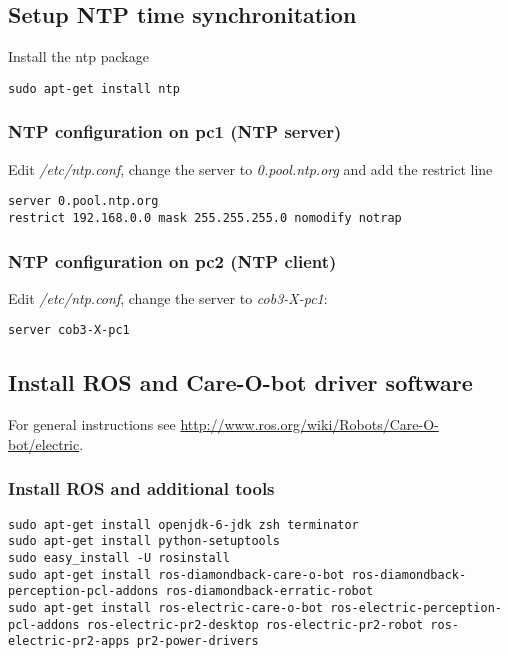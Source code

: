 \subsection{Setup NTP time synchronitation}
Install the ntp package

\begin{lstlisting}
sudo apt-get install ntp
\end{lstlisting}

\subsubsection{NTP configuration on pc1 (NTP server)}
Edit \textit{/etc/ntp.conf}, change the server to \textit{0.pool.ntp.org} and add the restrict line

\begin{lstlisting} 
server 0.pool.ntp.org
restrict 192.168.0.0 mask 255.255.255.0 nomodify notrap
\end{lstlisting}

\subsubsection{NTP configuration on pc2 (NTP client)}
Edit \textit{/etc/ntp.conf}, change the server to \textit{cob3-X-pc1}:
\begin{lstlisting}
server cob3-X-pc1
\end{lstlisting}

\subsection{Install ROS and Care-O-bot driver software}
For general instructions see \url{http://www.ros.org/wiki/Robots/Care-O-bot/electric}.

\subsubsection{Install ROS and additional tools}
\begin{lstlisting}
sudo apt-get install openjdk-6-jdk zsh terminator
sudo apt-get install python-setuptools
sudo easy_install -U rosinstall
sudo apt-get install ros-diamondback-care-o-bot ros-diamondback-perception-pcl-addons ros-diamondback-erratic-robot
sudo apt-get install ros-electric-care-o-bot ros-electric-perception-pcl-addons ros-electric-pr2-desktop ros-electric-pr2-robot ros-electric-pr2-apps pr2-power-drivers 
\end{lstlisting}

